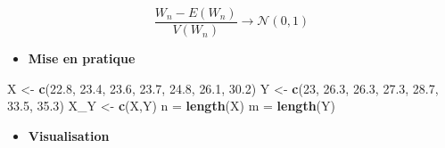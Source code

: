 \documentclass[
  12pt,
]{article}
\newenvironment{Shaded}{\begin{snugshade}}{\end{snugshade}}
\newcommand{\DecValTok}[1]{\textcolor[rgb]{0.00,0.00,0.81}{#1}}
\newcommand{\FloatTok}[1]{\textcolor[rgb]{0.00,0.00,0.81}{#1}}
\newcommand{\FunctionTok}[1]{\textcolor[rgb]{0.13,0.29,0.53}{\textbf{#1}}}
\newcommand{\NormalTok}[1]{#1}
\newcommand{\OtherTok}[1]{\textcolor[rgb]{0.56,0.35,0.01}{#1}}
\providecommand{\tightlist}{%
  \setlength{\itemsep}{0pt}\setlength{\parskip}{0pt}}
\begin{document}
\[\frac{W_n - E(W_n)}{V(W_n)} \rightarrow \mathcal{N(0,1)}\]

\begin{itemize}
\tightlist
\item
  \textbf{Mise en pratique}
\end{itemize}

\begin{Shaded}
\begin{Highlighting}[]
\NormalTok{ X }\OtherTok{\textless{}{-}} \FunctionTok{c}\NormalTok{(}\FloatTok{22.8}\NormalTok{, }\FloatTok{23.4}\NormalTok{, }\FloatTok{23.6}\NormalTok{, }\FloatTok{23.7}\NormalTok{, }\FloatTok{24.8}\NormalTok{, }\FloatTok{26.1}\NormalTok{, }\FloatTok{30.2}\NormalTok{)}
\NormalTok{ Y }\OtherTok{\textless{}{-}} \FunctionTok{c}\NormalTok{(}\DecValTok{23}\NormalTok{, }\FloatTok{26.3}\NormalTok{, }\FloatTok{26.3}\NormalTok{, }\FloatTok{27.3}\NormalTok{, }\FloatTok{28.7}\NormalTok{, }\FloatTok{33.5}\NormalTok{, }\FloatTok{35.3}\NormalTok{)}
\NormalTok{ X\_Y }\OtherTok{\textless{}{-}} \FunctionTok{c}\NormalTok{(X,Y)}
\NormalTok{ n }\OtherTok{=} \FunctionTok{length}\NormalTok{(X)}
\NormalTok{ m }\OtherTok{=} \FunctionTok{length}\NormalTok{(Y)}
\end{Highlighting}
\end{Shaded}

\begin{itemize}
\tightlist
\item
  \textbf{Visualisation}
\end{itemize}
\end{document}
